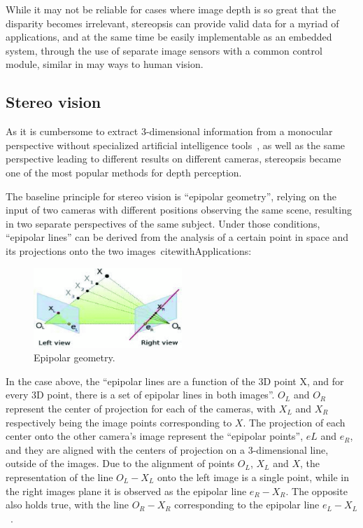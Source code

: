 While it may not be reliable for cases where image depth is so great that the disparity
becomes irrelevant, stereopsis can provide valid data for a myriad of applications,
and at the same time be easily implementable as an embedded system, through the use of
separate image sensors with a common control module, similar in may ways to human vision.

\subsection{Stereo vision}

As it is cumbersome to extract 3-dimensional information from a monocular perspective without
specialized artificial intelligence tools~\cite{withAI}, as well as the same perspective leading
to different results on different cameras, stereopsis became one of the most popular methods
for depth perception.~\cite{withApplications}

The baseline principle for stereo vision is ``epipolar geometry'', relying on the input of two
cameras with different positions observing the same scene, resulting in two separate perspectives
of the same subject. Under those conditions, ``epipolar lines'' can be derived from the analysis
of a certain point in space and its projections onto the two images~cite{withApplications}:

\begin{figure}[H]
    \includegraphics[width=0.50\textwidth, height=0.25\textwidth]{resources/png/epipolar_geometry.png}
    \caption{Epipolar geometry.~\cite{withApplications}~\label{figEpipolar}}
\end{figure}

In the case above, the ``epipolar lines are a function of the 3D point X, and for every 3D point,
there is a set of epipolar lines in both images''. \(O_{L}\) and \(O_{R}\) represent the center of
projection for each of the cameras, with \(X_{L}\) and \(X_{R}\) respectively being the image
points corresponding to \(X\). The projection of each center onto the other camera's image 
represent the ``epipolar points'', \(e{L}\) and \(e_{R}\), and they are aligned with the centers
of projection on a 3-dimensional line, outside of the images. Due to the alignment of points 
\(O_{L}\), \(X_{L}\) and \(X\), the representation of the line \(O_{L} - X_{L}\) onto the left 
image is a single point, while in the right images plane it is observed as the epipolar line
\(e_{R} - X_{R}\). The opposite also holds true, with the line \(O_{R} - X_{R}\) corresponding
to the epipolar line \(e_{L} - X_{L}\)~\cite{withApplications}.

